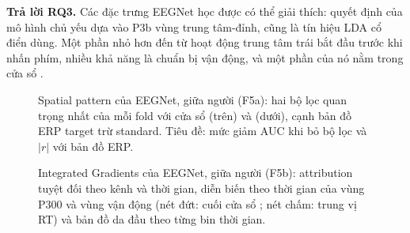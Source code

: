 \textbf{Trả lời RQ3.} Các đặc trưng EEGNet học được có thể giải thích: quyết định của mô hình chủ yếu dựa vào P3b vùng trung tâm-đỉnh, cũng là tín hiệu LDA cổ điển dùng. Một phần nhỏ hơn đến từ hoạt động trung tâm trái bắt đầu trước khi nhấn phím, nhiều khả năng là chuẩn bị vận động, và một phần của nó nằm trong cửa sổ .

\begin{figure}[H]
\centering
{}
\caption{Spatial pattern của EEGNet, giữa người (F5a): hai bộ lọc quan trọng nhất của mỗi fold với cửa sổ  (trên) và  (dưới), cạnh bản đồ ERP target trừ standard. Tiêu đề: mức giảm AUC khi bỏ bộ lọc và $|r|$ với bản đồ ERP.}
\label{fig:rq3-patterns}
\end{figure}

\begin{figure}[H]
\centering
{}
\caption{Integrated Gradients của EEGNet, giữa người (F5b): attribution tuyệt đối theo kênh và thời gian, diễn biến theo thời gian của vùng P300 và vùng vận động (nét đứt: cuối cửa sổ ; nét chấm: trung vị RT) và bản đồ da đầu theo từng bin thời gian.}
\label{fig:rq3-ig}
\end{figure}
